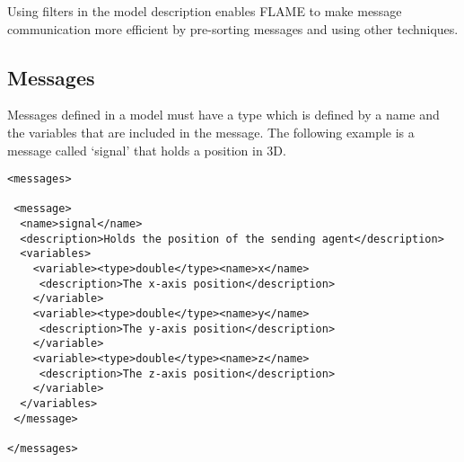 Using filters in the model description enables FLAME to make message
communication more efficient by pre-sorting messages and using other techniques.


\subsection{Messages}

Messages defined in a model must have a type which is defined by a name and the
variables that are included in the message. The following example is a message
called `signal' that holds a position in 3D.

\begin{mylisting}
\begin{verbatim}
<messages>

 <message>
  <name>signal</name>
  <description>Holds the position of the sending agent</description>
  <variables>
    <variable><type>double</type><name>x</name>
     <description>The x-axis position</description>
    </variable>
    <variable><type>double</type><name>y</name>
     <description>The y-axis position</description>
    </variable>
    <variable><type>double</type><name>z</name>
     <description>The z-axis position</description>
    </variable>
  </variables>
 </message>

</messages>
\end{verbatim}
\end{mylisting}
